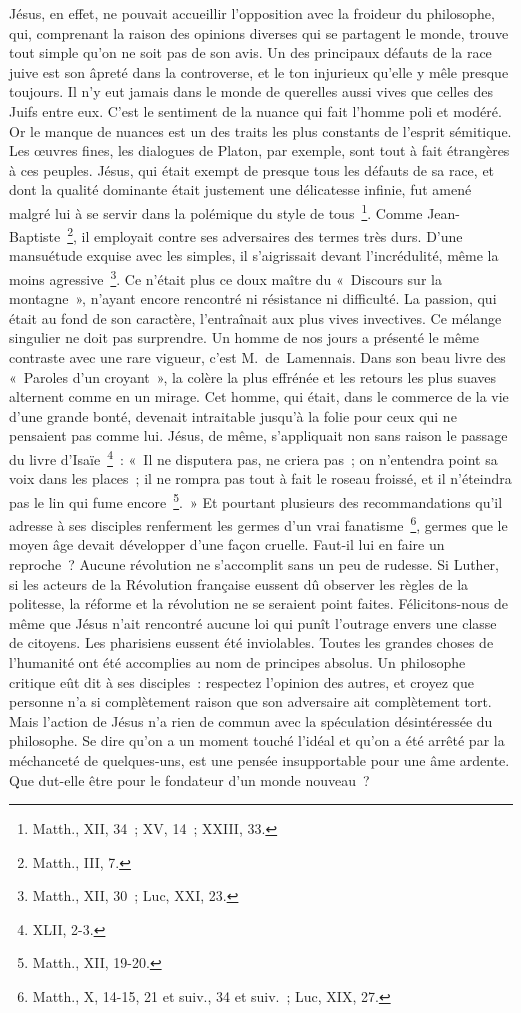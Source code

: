 \documentclass[french,twoside]{book} %
\begin{document}
Jésus, en effet, ne pouvait accueillir l’opposition avec la froideur du philosophe, qui, comprenant la raison des opinions diverses qui se partagent le monde, trouve tout simple qu’on ne soit pas de son avis. Un des principaux défauts de la race juive est son âpreté dans la controverse, et le ton injurieux qu’elle y mêle presque toujours. Il n’y eut jamais dans le monde de querelles aussi vives que celles des Juifs entre eux. C’est le sentiment de la nuance qui fait l’homme poli et modéré. Or le manque de nuances est un des traits les plus constants de l’esprit sémitique. Les œuvres fines, les dialogues de Platon, par exemple, sont tout à fait étrangères à ces peuples. Jésus, qui était exempt de presque tous les défauts de sa race, et dont la qualité dominante était justement une délicatesse infinie, fut amené malgré lui à se servir dans la polémique du style de tous \footnote{Matth., XII, 34 ; XV, 14 ; XXIII, 33.}. Comme Jean-Baptiste \footnote{Matth., III, 7.}, il employait contre ses adversaires des termes très durs. D’une mansuétude exquise avec les simples, il s’aigrissait devant l’incrédulité, même la moins agressive \footnote{Matth., XII, 30 ; Luc, XXI, 23.}. Ce n’était plus ce doux maître du « Discours sur la montagne », n’ayant encore rencontré ni résistance ni difficulté. La passion, qui était au fond de son caractère, l’entraînait aux plus vives invectives. Ce mélange singulier ne doit pas surprendre. Un homme de nos jours a présenté le même contraste avec une rare vigueur, c’est M. de Lamennais. Dans son beau livre des « Paroles d’un croyant », la colère la plus effrénée et les retours les plus suaves alternent comme en un mirage. Cet homme, qui était, dans le commerce de la vie d’une grande bonté, devenait intraitable jusqu’à la folie pour ceux qui ne pensaient pas comme lui. Jésus, de même, s’appliquait non sans raison le passage du livre d’Isaïe \footnote{XLII, 2-3.} : « Il ne disputera pas, ne criera pas ; on n’entendra point sa voix dans les places ; il ne rompra pas tout à fait le roseau froissé, et il n’éteindra pas le lin qui fume encore \footnote{Matth., XII, 19-20.}. » Et pourtant plusieurs des recommandations qu’il adresse à ses disciples renferment les germes d’un vrai fanatisme \footnote{Matth., X, 14-15, 21 et suiv., 34 et suiv. ; Luc, XIX, 27.}, germes que le moyen âge devait développer d’une façon cruelle. Faut-il lui en faire un reproche ? Aucune révolution ne s’accomplit sans un peu de rudesse. Si Luther, si les acteurs de la Révolution française eussent dû observer les règles de la politesse, la réforme et la révolution ne se seraient point faites. Félicitons-nous de même que Jésus n’ait rencontré aucune loi qui punît l’outrage envers une classe de citoyens. Les pharisiens eussent été inviolables. Toutes les grandes choses de l’humanité ont été accomplies au nom de principes absolus. Un philosophe critique eût dit à ses disciples : respectez l’opinion des autres, et croyez que personne n’a si complètement raison que son adversaire ait complètement tort. Mais l’action de Jésus n’a rien de commun avec la spéculation désintéressée du philosophe. Se dire qu’on a un moment touché l’idéal et qu’on a été arrêté par la méchanceté de quelques-uns, est une pensée insupportable pour une âme ardente. Que dut-elle être pour le fondateur d’un monde nouveau ?\par
\end{document}
